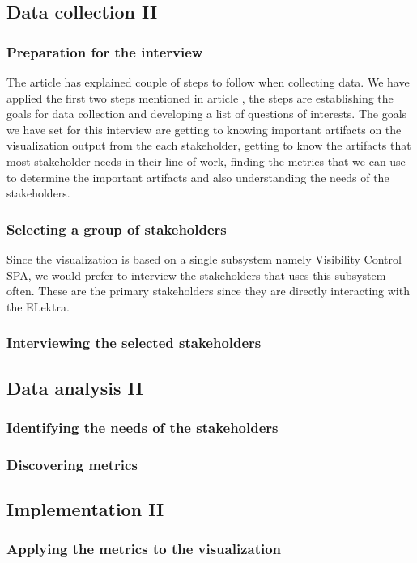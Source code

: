 \subsection{Data collection II}

\subsubsection{Preparation for the interview}
The article \cite{Basili} has explained couple of steps to follow when collecting data. We have applied the first two steps mentioned in article \cite{Basili}, the steps are establishing the goals for data collection and developing a list of questions of interests. The goals we have set for this interview are getting to knowing important artifacts on the visualization output from the each stakeholder, getting to know the artifacts that most stakeholder needs in their line of work, finding the metrics that we can use to determine the important artifacts and also understanding the needs of the stakeholders. 

\subsubsection{Selecting a group of stakeholders}
Since the visualization is based on a single subsystem namely Visibility Control SPA, we would prefer to interview the stakeholders that uses this subsystem often. These are the primary stakeholders since they are directly interacting with the ELektra.

\subsubsection{Interviewing the selected stakeholders}
\todo{[to be filled in]}

\subsection{Data analysis II}

\subsubsection{Identifying the needs of the stakeholders}
\todo{[to be filled in]}

\subsubsection{Discovering metrics}
\todo{[to be filled in]}

\subsection{Implementation II}

\subsubsection{Applying the metrics to the visualization}
\todo{[to be filled in]}
